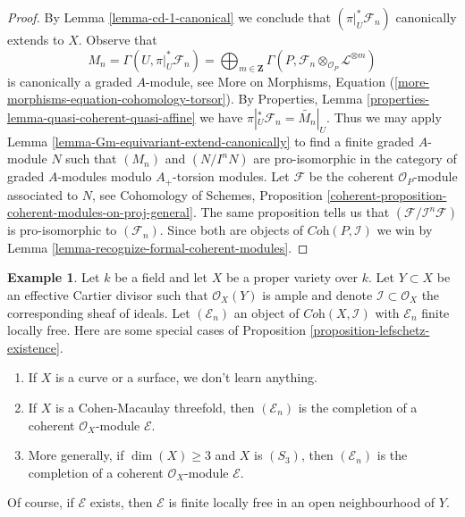 \documentclass{stacks-project}
\theoremstyle{plain}
\theoremstyle{definition}
\newtheorem{example}[subsection]{Example}
\theoremstyle{remark}
\numberwithin{equation}{subsection}
\begin{document}
\begin{proof}
\medskip\noindent
By Lemma \ref{lemma-cd-1-canonical} we conclude that
$(\pi|_U^*\mathcal{F}_n)$ canonically extends to $X$.
Observe that
$$
M_n = \Gamma(U, \pi|_U^*\mathcal{F}_n) =
\bigoplus\nolimits_{m \in \mathbf{Z}}
\Gamma(P, \mathcal{F}_n \otimes_{\mathcal{O}_P} \mathcal{L}^{\otimes m})
$$
is canonically a graded $A$-module, see
More on Morphisms, Equation (\ref{more-morphisms-equation-cohomology-torsor}).
By Properties, Lemma \ref{properties-lemma-quasi-coherent-quasi-affine}
we have $\pi|_U^*\mathcal{F}_n = \widetilde{M_n}|_U$.
Thus we may apply Lemma \ref{lemma-Gm-equivariant-extend-canonically}
to find a finite graded $A$-module $N$ such that
$(M_n)$ and $(N/I^nN)$ are pro-isomorphic in the category
of graded $A$-modules modulo $A_+$-torsion modules.
Let $\mathcal{F}$ be the coherent $\mathcal{O}_P$-module
associated to $N$, see
Cohomology of Schemes, Proposition
\ref{coherent-proposition-coherent-modules-on-proj-general}.
The same proposition tells us that $(\mathcal{F}/\mathcal{I}^n\mathcal{F})$
is pro-isomorphic to $(\mathcal{F}_n)$.
Since both are objects of $\textit{Coh}(P, \mathcal{I})$
we win by Lemma \ref{lemma-recognize-formal-coherent-modules}.
\end{proof}

\begin{example}
\label{example-lefschetz-existence}
Let $k$ be a field and let $X$ be a proper variety over $k$.
Let $Y \subset X$ be an effective Cartier divisor such that
$\mathcal{O}_X(Y)$ is ample and denote
$\mathcal{I} \subset \mathcal{O}_X$ the corresponding
sheaf of ideals. Let $(\mathcal{E}_n)$ an object
of $\textit{Coh}(X, \mathcal{I})$ with $\mathcal{E}_n$
finite locally free.
Here are some special cases of
Proposition \ref{proposition-lefschetz-existence}.
\begin{enumerate}
\item If $X$ is a curve or a surface, we don't learn anything.
\item If $X$ is a Cohen-Macaulay threefold, then
$(\mathcal{E}_n)$ is the completion of a coherent
$\mathcal{O}_X$-module $\mathcal{E}$.
\item More generally, if $\dim(X) \geq 3$ and $X$ is $(S_3)$, then
$(\mathcal{E}_n)$ is the completion of a coherent
$\mathcal{O}_X$-module $\mathcal{E}$.
\end{enumerate}
Of course, if $\mathcal{E}$ exists, then $\mathcal{E}$ is finite locally
free in an open neighbourhood of $Y$.
\end{example}
\end{document}
